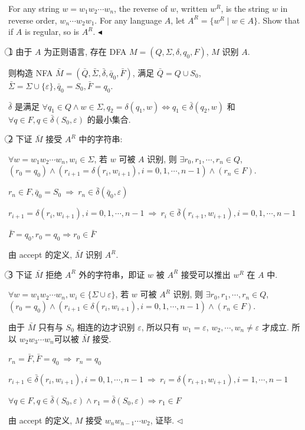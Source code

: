 \documentclass[11pt]{article}
\newenvironment{problem}[2][Problem]{\begin{trivlist}
		\item[\hskip \labelsep {\bfseries #1}\hskip \labelsep {\bfseries #2.}]}{\hfill$\blacktriangleleft$\end{trivlist}}
\newenvironment{answer}[1][Answer]{\begin{trivlist}
		\item[\hskip \labelsep {\bfseries #1.}\hskip \labelsep]}{\hfill$\lhd$\end{trivlist}}
\begin{document}
	\begin{problem}{2.(20 points)}
		For any string $w = w_1w_2\cdots w_n$, the reverse of $w$, written $w^R$, is the string $w$ in reverse
		order, $w_n\cdots w_2w_1$. For any language $A$, let $A^R = \{w^R\mid w\in A\}$. Show that if $A$ is regular, so is $A^R$.
	\end{problem}
	\begin{answer}
		\textcircled{1} 由于 $A$ 为正则语言, 存在 DFA  $M=(Q,\Sigma,\delta,q_0,F)$, $M$ 识别 $A$.
		
		则构造 NFA $\bar{M}=(\bar{Q},\bar{\Sigma},\bar{\delta},\bar{q}_0,\bar{F})$, 满足 $\bar{Q}=Q\cup S_0$, $\bar{\Sigma}=\Sigma\cup\{\varepsilon\},\bar{q}_0=S_0,\bar{F}=q_0$.
		
		$\bar{\delta}$ 是满足 $\forall q_1\in Q\wedge w\in\Sigma, q_2=\delta(q_1,w)\Leftrightarrow q_1\in\bar{\delta}(q_2,w)$ 和 $\forall q\in F,q\in \bar{\delta}(S_0,\varepsilon)$ 的最小集合.
		
		\textcircled{2} 下证 $\bar{M}$ 接受 $A^R$ 中的字符串:
		
		$\forall w=w_1w_2\cdots w_n,w_i\in\Sigma$, 若 $w$ 可被 $A$ 识别, 则 $\exists r_0,r_1,\cdots,r_n\in Q$, $(r_0=q_0)\wedge (r_{i+1}=\delta(r_i,w_{i+1}),i=0,1,\cdots,n-1)\wedge (r_n\in F)$.
		
		$r_n\in F,\bar{q}_0=S_0~\Rightarrow~ r_n\in\bar{\delta}(\bar{q}_0,\varepsilon)$
		
		$r_{i+1}=\delta(r_i,w_{i+1}),i=0,1,\cdots,n-1~\Rightarrow~r_i\in\bar{\delta}(r_{i+1},w_{i+1}),i=0,1,\cdots,n-1$
		
		$\bar{F}=q_0,r_0=q_0\Rightarrow r_0\in\bar{F}$
		
		由 accept 的定义, $\bar{M}$ 识别 $A^R$.
		
		\textcircled{3} 下证 $\bar{M}$ 拒绝 $A^R$ 外的字符串，即证 $w$ 被 $A^R$ 接受可以推出 $w^R$ 在 $A$ 中.
		
		$\forall w=w_1w_2\cdots w_n,w_i\in\{\Sigma\cup\varepsilon\}$, 若 $w$ 可被 $A^R$ 识别, 则 $\exists r_0,r_1,\cdots,r_n\in Q$, $(r_0=q_0)\wedge (r_{i+1}\in\delta(r_i,w_{i+1}),i=0,1,\cdots,n-1)\wedge (r_n\in F)$.
		
		由于 $\bar{M}$ 只有与 $S_0$ 相连的边才识别 $\varepsilon$, 所以只有 $w_1=\varepsilon$, $w_2,\cdots,w_n\neq\varepsilon$ 才成立. 所以 $w_2w_3\cdots w_n$可以被 $\bar{M}$ 接受.
		
		$r_n=\bar{F},\bar{F}=q_0~\Rightarrow~r_n=q_0$
		
		$r_{i+1}\in\bar{\delta}(r_i,w_{i+1}),i=0,1,\cdots,n-1~\Rightarrow~r_i=\delta(r_{i+1},w_{i+1}),i=1,\cdots,n-1$
		
		$\forall q\in F,q\in \bar{\delta}(S_0,\varepsilon)\wedge r_1=\bar\delta(S_0,\varepsilon)\Rightarrow r_1\in F$
		
		由 accept 的定义, $M$ 接受 $w_nw_{n-1}\cdots w_2$, 证毕.
	\end{answer}
\end{document}
